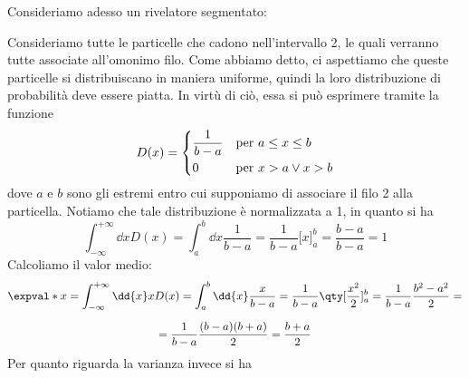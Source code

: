 Consideriamo adesso un rivelatore segmentato:
\begin{figure}[H]
   \centering
\end{figure}
Consideriamo tutte le particelle che cadono nell'intervallo 2, le quali verranno tutte associate all'omonimo filo. Come abbiamo detto, ci aspettiamo che queste particelle si distribuiscano in maniera uniforme, quindi la loro distribuzione di probabilità deve essere piatta. In virtù di ciò, essa si può esprimere tramite la funzione
\begin{equation*}
   D(x)=
   \begin{dcases}
      \frac{1}{b-a} & \text{per } a \leq x \leq b\\
      0 & \text{per } x>a \vee x>b\\
   \end{dcases}
\end{equation*}
dove $a$ e $b$ sono gli estremi entro cui supponiamo di associare il filo 2 alla particella. Notiamo che tale distribuzione è normalizzata a 1, in quanto si ha
\begin{equation*}
   \int_{-\infty}^{+\infty} \dd{x} D(x)
   =\int_{a}^{b} \dd{x} \frac{1}{b-a}
   =\frac{1}{b-a} \bigl[ x \bigr]_{a}^{b}
   =\frac{b-a}{b-a}
   =1
\end{equation*}
Calcoliamo il valor medio:
\begin{gather*}
   \expval*{x}
   =\int_{-\infty}^{+\infty} \dd{x} x D(x)
   =\int_{a}^{b} \dd{x} \frac{x}{b-a}
   =\frac{1}{b-a} \qty[ \frac{x^2}{2} ]_{a}^{b}
   =\frac{1}{b-a} \frac{b^2 - a^2}{2}=
   \\[0.2cm]
   =\frac{1}{b-a} \frac{(b - a)(b + a)}{2}
   =\frac{b + a}{2}
\end{gather*}
Per quanto riguarda la varianza invece si ha
